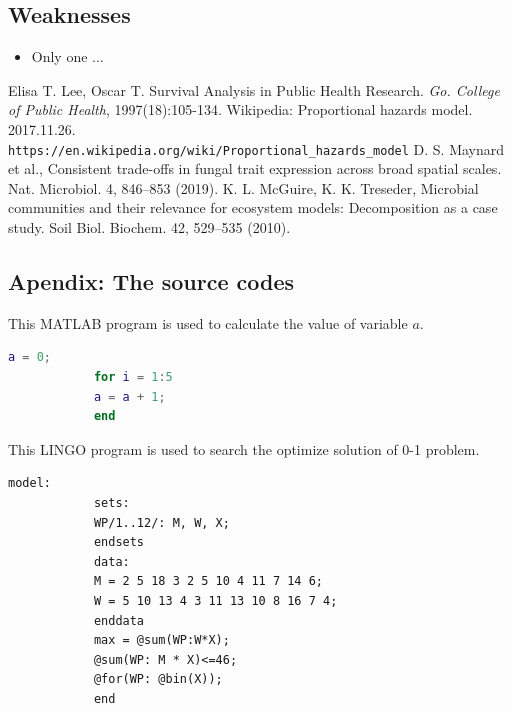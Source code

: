 \documentclass[12pt]{article}
\begin{document}
	\subsection{Weaknesses}
	\begin{itemize}
		\item Only one ...
	\end{itemize}
	
	\begin{thebibliography}{99} 
		Elisa T. Lee, Oscar T. Survival Analysis in Public Health Research. \emph{Go. College of Public Health}, 1997(18):105-134.
		Wikipedia: Proportional hazards model. 2017.11.26. \texttt{\\https://en.wikipedia.org/wiki/Proportional\_{}hazards\_{}model}
		D. S. Maynard et al., Consistent trade-offs in fungal trait expression across broad
		spatial scales. Nat. Microbiol. 4, 846–853 (2019).
		K. L. McGuire, K. K. Treseder, Microbial communities and their relevance for ecosystem models: Decomposition as a case study. Soil Biol. Biochem. 42, 529–535 (2010).
	\end{thebibliography}
	
	
	\clearpage
	\begin{subappendices}						%
		\section*{Apendix: The source codes}		%
		
		This MATLAB program is used to calculate the value of variable $a$.
		\begin{lstlisting}[language=Matlab, caption=\texttt{temp.m}]
			a = 0;
			for i = 1:5
			a = a + 1;
			end
		\end{lstlisting}
		
		This LINGO program is used to search the optimize solution of 0-1 problem.
		\begin{lstlisting}[language=Lingo, caption=\texttt{temp.lg4}]
			model:
			sets:
			WP/1..12/: M, W, X;
			endsets
			data:
			M = 2 5 18 3 2 5 10 4 11 7 14 6;
			W = 5 10 13 4 3 11 13 10 8 16 7 4;
			enddata
			max = @sum(WP:W*X);
			@sum(WP: M * X)<=46;
			@for(WP: @bin(X));
			end
		\end{lstlisting}
		
	\end{subappendices}
	
	
	
\end{document}
